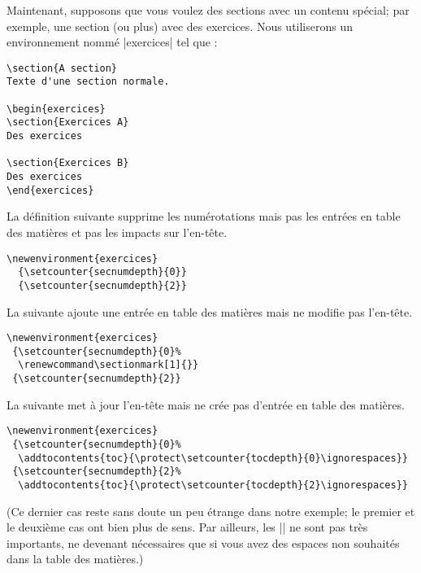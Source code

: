 \documentclass[a4paper]{ltxguide}
\begin{document}
Maintenant, supposons que vous voulez des sections avec un contenu spécial; par
exemple, une section (ou plus) avec des exercices. Nous utiliserons un
environnement nommé |exercices| tel que : 
\begin{verbatim}
\section{A section}
Texte d'une section normale.

\begin{exercices}
\section{Exercices A}
Des exercices

\section{Exercices B}
Des exercices
\end{exercices}
\end{verbatim}

La définition suivante supprime les numérotations mais pas les entrées en
table des matières et pas les impacts sur l'en-tête.
\begin{verbatim}
\newenvironment{exercices}
  {\setcounter{secnumdepth}{0}}
  {\setcounter{secnumdepth}{2}}
\end{verbatim}

La suivante ajoute une entrée en table des matières mais ne modifie pas l'en-tête.
\begin{verbatim}
\newenvironment{exercices}
 {\setcounter{secnumdepth}{0}%
  \renewcommand\sectionmark[1]{}}
 {\setcounter{secnumdepth}{2}}
\end{verbatim}

La suivante met à jour l'en-tête mais ne crée pas d'entrée en table des matières.
\begin{verbatim}
\newenvironment{exercices}
 {\setcounter{secnumdepth}{0}%
  \addtocontents{toc}{\protect\setcounter{tocdepth}{0}\ignorespaces}}
 {\setcounter{secnumdepth}{2}%
  \addtocontents{toc}{\protect\setcounter{tocdepth}{2}\ignorespaces}}
\end{verbatim}
(Ce dernier cas reste sans doute un peu étrange dans notre exemple; le premier
et le deuxième cas ont bien plus de sens. Par ailleurs, les |\ignorespaces| ne
sont pas très importants, ne devenant nécessaires que si vous avez des espaces
non souhaités dans la table des matières.) 
\end{document}
